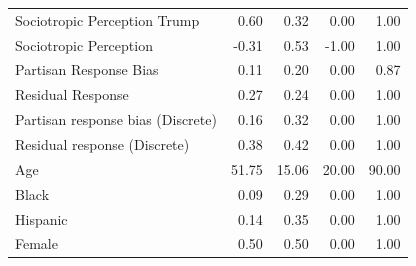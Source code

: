 \documentclass{article}\usepackage[]{graphicx}\usepackage[]{xcolor}
\begin{document}
\begin{table}[H]
\begin{minipage}[t]{0.48\linewidth}
{\begin{tabular}{lrrrr}
  Sociotropic Perception Trump & 0.60 & 0.32 & 0.00 & 1.00 \\ 
  Sociotropic Perception & -0.31 & 0.53 & -1.00 & 1.00 \\ 
  Partisan Response Bias & 0.11 & 0.20 & 0.00 & 0.87 \\ 
  Residual Response & 0.27 & 0.24 & 0.00 & 1.00 \\ 
  Partisan response bias (Discrete) & 0.16 & 0.32 & 0.00 & 1.00 \\ 
  Residual response (Discrete) & 0.38 & 0.42 & 0.00 & 1.00 \\ 
  Age & 51.75 & 15.06 & 20.00 & 90.00 \\ 
  Black & 0.09 & 0.29 & 0.00 & 1.00 \\ 
  Hispanic & 0.14 & 0.35 & 0.00 & 1.00 \\ 
  Female & 0.50 & 0.50 & 0.00 & 1.00 \\ 
   \hline
\end{tabular}
}
\end{minipage}
\end{table}
\end{document}
